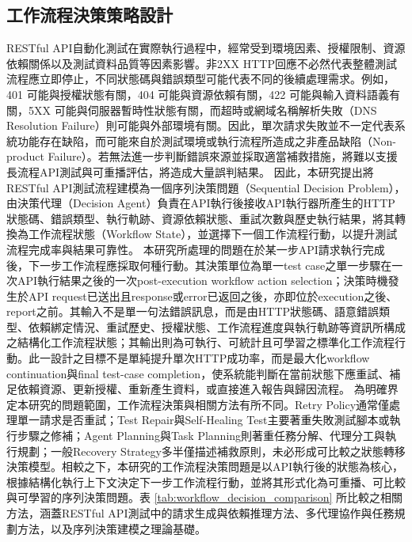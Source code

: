 \begin{ZhChapter}
\section{工作流程決策策略設計}
\text RESTful API自動化測試在實際執行過程中，經常受到環境因素、授權限制、資源依賴關係以及測試資料品質等因素影響。非2XX HTTP回應不必然代表整體測試流程應立即停止，不同狀態碼與錯誤類型可能代表不同的後續處理需求。例如，401 可能與授權狀態有關，404 可能與資源依賴有關，422 可能與輸入資料語義有關，5XX 可能與伺服器暫時性狀態有關，而超時或網域名稱解析失敗（DNS Resolution Failure）則可能與外部環境有關。因此，單次請求失敗並不一定代表系統功能存在缺陷，而可能來自於測試環境或執行流程所造成之非產品缺陷（Non-product Failure）。若無法進一步判斷錯誤來源並採取適當補救措施，將難以支援長流程API測試與可重播評估，將造成大量誤判結果。
\text 因此，本研究提出將RESTful API測試流程建模為一個序列決策問題（Sequential Decision Problem），由決策代理（Decision Agent）負責在API執行後接收API執行器所產生的HTTP狀態碼、錯誤類型、執行軌跡、資源依賴狀態、重試次數與歷史執行結果，將其轉換為工作流程狀態（Workflow State），並選擇下一個工作流程行動，以提升測試流程完成率與結果可靠性。
\text 本研究所處理的問題在於某一步API請求執行完成後，下一步工作流程應採取何種行動。其決策單位為單一test case之單一步驟在一次API執行結果之後的一次post-execution workflow action selection；決策時機發生於API request已送出且response或error已返回之後，亦即位於execution之後、report之前。其輸入不是單一句法錯誤訊息，而是由HTTP狀態碼、語意錯誤類型、依賴綁定情況、重試歷史、授權狀態、工作流程進度與執行軌跡等資訊所構成之結構化工作流程狀態；其輸出則為可執行、可統計且可學習之標準化工作流程行動。此一設計之目標不是單純提升單次HTTP成功率，而是最大化workflow continuation與final test-case completion，使系統能判斷在當前狀態下應重試、補足依賴資源、更新授權、重新產生資料，或直接進入報告與歸因流程。
\text 為明確界定本研究的問題範圍，工作流程決策與相關方法有所不同。Retry Policy通常僅處理單一請求是否重試；Test Repair與Self-Healing Test主要著重失敗測試腳本或執行步驟之修補；Agent Planning與Task Planning則著重任務分解、代理分工與執行規劃；一般Recovery Strategy多半僅描述補救原則，未必形成可比較之狀態轉移決策模型。相較之下，本研究的工作流程決策問題是以API執行後的狀態為核心，根據結構化執行上下文決定下一步工作流程行動，並將其形式化為可重播、可比較與可學習的序列決策問題\parencite{Song2023RestGPT, Wu2023AutoGen}。表 \ref{tab:workflow_decision_comparison} 所比較之相關方法，涵蓋RESTful API測試中的請求生成與依賴推理方法\parencite{Zheng2024RESTLess,Nguyen2024KAT,Kim2025LlamaRestTest}、多代理協作與任務規劃方法\parencite{Wu2023AutoGen,Song2023RestGPT}，以及序列決策建模之理論基礎\parencite{rao2022foundations}。

\end{ZhChapter}

